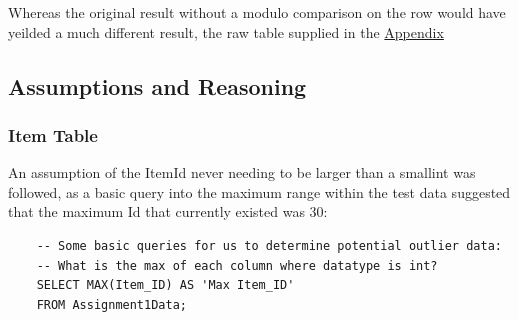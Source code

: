 \documentclass{article}
\begin{document}
            Whereas the original result without a modulo comparison on the row would have yeilded
            a much different result, the raw table supplied in the \hyperref[sec:Appendix]{\color{blue}Appendix}

        \newpage
        \subsection{Assumptions and Reasoning}
            \subsubsection{Item Table}
                An assumption of the ItemId never needing to be larger than a smallint
                was followed, as a basic query into the maximum range within the test data
                suggested that the maximum Id that currently existed was 30:
                \begin{verbatim}
    -- Some basic queries for us to determine potential outlier data:
    -- What is the max of each column where datatype is int?
    SELECT MAX(Item_ID) AS 'Max Item_ID'
    FROM Assignment1Data;
                \end{verbatim}
\end{document}
